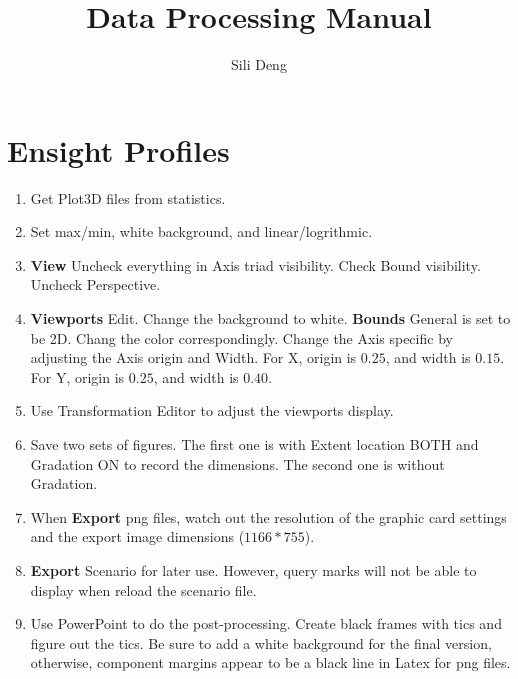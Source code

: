 \documentclass[11pt,english]{article}
\begin{document}
\title{Data Processing Manual}

\author{Sili Deng}
\maketitle

\section{Ensight Profiles}
\begin{enumerate}
  \item Get Plot3D files from statistics.
  \item Set max/min, white background, and linear/logrithmic.
  \item \textbf{View} Uncheck everything in Axis triad visibility.  Check Bound visibility.  Uncheck Perspective. 
  \item \textbf{Viewports} Edit.  Change the background to white.  \textbf{Bounds} General is set to be 2D.  Chang the color correspondingly.  Change the Axis specific by adjusting the Axis origin and Width.  For X, origin is $0.25$, and width is $0.15$.  For Y, origin is $0.25$, and width is $0.40$. 
  \item Use Transformation Editor to adjust the viewports display.
  \item Save two sets of figures.  The first one is with Extent location BOTH and Gradation ON to record the dimensions.  The second one is without Gradation.
  \item When \textbf{Export} png files, watch out the resolution of the graphic card settings and the export image dimensions ($1166 * 755$).   
  \item \textbf{Export} Scenario for later use.  However, query marks will not be able to display when reload the scenario file.
  \item Use PowerPoint to do the post-processing.  Create black frames with tics and figure out the tics.  Be sure to add a white background for the final version, otherwise, component margins appear to be a black line in Latex for png files.
\end{enumerate}
\end{document}
